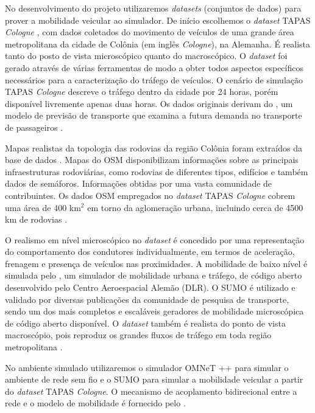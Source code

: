 \documentclass[mestrado, pre-defesa, english, brazil]{packages/icmc}
\begin{document}
No desenvolvimento do projeto utilizaremos \textit{datasets} (conjuntos de dados) para prover a mobilidade veicular ao simulador. De início escolhemos o \textit{dataset} TAPAS \textit{Cologne} \cite{tapas-2014}, com dados coletados do movimento de veículos de uma grande área metropolitana da cidade de Colônia (em inglês \textit{Cologne}), na Alemanha. É realista tanto do posto de vista microscópico quanto do macroscópico. O \textit{dataset} foi gerado através de várias ferramentas de modo a obter todos aspectos específicos necessários para a caracterização do tráfego de veículos. O cenário de simulação TAPAS \textit{Cologne} descreve o tráfego dentro da cidade por 24 horas, porém disponível livremente apenas duas horas. Os dados originais derivam do , um modelo de previsão de transporte que examina a futura demanda no transporte de passageiros \cite{uppoor-2012,tapas-2014}.

Mapas realistas da topologia das rodovias da região Colônia foram extraídos da base de dados . Mapas do OSM disponibilizam informações sobre as principais infraestruturas rodoviárias, como rodovias de diferentes tipos, edifícios e também dados de semáforos. Informações obtidas por uma vasta comunidade de contribuintes. Os dados OSM empregados no \textit{dataset} TAPAS \textit{Cologne} cobrem uma área de 400 km$^{2}$ em torno da aglomeração urbana, incluindo cerca de 4500 km de rodovias \cite{tapas-2014,uppoor-2012}.

O realismo em nível microscópico no \textit{dataset} é concedido por uma representação do comportamento dos condutores individualmente, em termos de aceleração, frenagem e presença de veículos nas proximidades. A mobilidade de baixo nível é simulada pelo  \cite{SUMO-2012}, um simulador de mobilidade urbana e tráfego, de código aberto desenvolvido pelo Centro Aeroespacial Alemão (DLR). O SUMO é utilizado e validado por diversas publicações da comunidade de pesquisa de transporte, sendo um dos mais completos e escaláveis geradores de mobilidade microscópica de código aberto disponível. O \textit{dataset} também é realista do ponto de vista macroscópio, pois reproduz os grandes fluxos de tráfego em toda região metropolitana \cite{uppoor-2012,tapas-2014}.

No ambiente simulado utilizaremos o simulador OMNeT ++ \cite{OMNeT++-2014} para simular o ambiente de rede sem fio e o SUMO para simular a mobilidade veicular a partir do \textit{dataset} TAPAS \textit{Cologne}. O mecanismo de acoplamento bidirecional entre a rede e o modelo de mobilidade é fornecido pelo  \cite{Veins-2014}.
\end{document}
